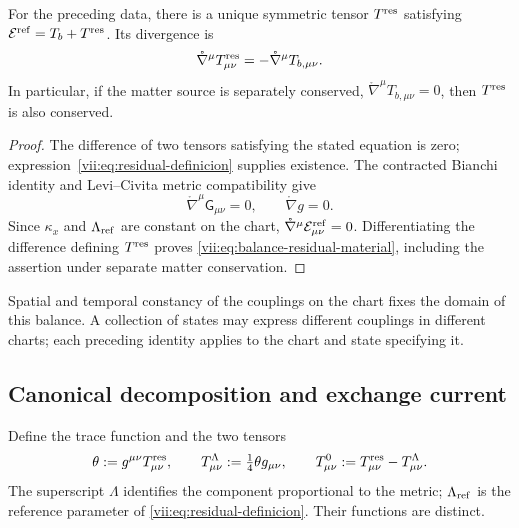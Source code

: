 \begin{theorem}
\label{vii:thm:residual-unicidad-balance}
For the preceding data, there is a unique symmetric tensor
\(T^{\rm res}\) satisfying
\(\mathcal E^{\rm ref}=T_b+T^{\rm res}\). Its divergence is
\begin{equation}
 \mathring\nabla^\mu T^{\rm res}_{\mu\nu}
 =-\mathring\nabla^\mu T_{b,\mu\nu}.
 \label{vii:eq:balance-residual-material}
\end{equation}
In particular, if the matter source is separately conserved,
\(\mathring\nabla^\mu T_{b,\mu\nu}=0\), then
\(T^{\rm res}\) is also conserved.
\end{theorem}
\begin{proof}
The difference of two tensors satisfying the stated equation is
zero; expression~\eqref{vii:eq:residual-definicion} supplies
existence. The contracted Bianchi identity and Levi--Civita metric
compatibility give
\[
 \mathring\nabla^\mu\mathsf G_{\mu\nu}=0,
 \qquad \mathring\nabla g=0.
\]
Since \(\kappa_x\) and \(\Lambda_{\rm ref}\) are constant
on the chart, \(\mathring\nabla^\mu\mathcal E^{\rm ref}_{\mu\nu}=0\).
Differentiating the difference defining \(T^{\rm res}\) proves
\eqref{vii:eq:balance-residual-material}, including the assertion
under separate matter conservation.
\end{proof}

Spatial and temporal constancy of the couplings on the chart fixes
the domain of this balance. A collection of states may express different
couplings in different charts; each preceding identity applies to
the chart and state specifying it.

\subsection{Canonical decomposition and exchange current}
\label{vii:subsec:traza-corriente-residual}

Define the trace function and the two tensors
\begin{equation}
 \theta:=g^{\mu\nu}T^{\rm res}_{\mu\nu},\qquad
 T^{\Lambda}_{\mu\nu}:=\tfrac14\theta g_{\mu\nu},\qquad
 T^{0}_{\mu\nu}:=T^{\rm res}_{\mu\nu}-T^{\Lambda}_{\mu\nu}.
 \label{vii:eq:descomposicion-traza-residual}
\end{equation}
The superscript \(\Lambda\) identifies the component proportional
to the metric; \(\Lambda_{\rm ref}\) is the reference parameter
of \eqref{vii:eq:residual-definicion}. Their functions are distinct.

